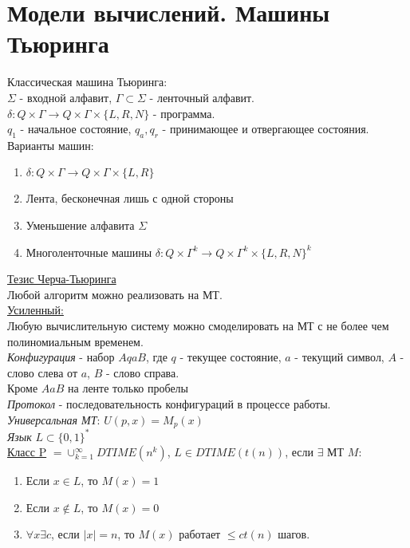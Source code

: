 	\section{Модели вычислений. Машины Тьюринга}
	Классическая машина Тьюринга:\\
	$\Sigma$ - входной алфавит, $\Gamma \subset \Sigma$ - ленточный алфавит.\\
	$\delta: Q\times\Gamma \to Q\times\Gamma\times\{L,R,N\}$ - программа.\\
	$q_1$ - начальное состояние,  $q_a, q_r$ - принимающее и отвергающее состояния.\\
	
	Варианты машин:
	\begin{enumerate}
		\item $\delta: Q\times\Gamma \to Q\times\Gamma\times\{L,R\}$
		\item Лента, бесконечная лишь с одной стороны
		\item Уменьшение алфавита $\Sigma$
		\item  Многоленточные машины $\delta:Q\times\Gamma^k \to Q\times\Gamma^k\times \{L,R,N\}^k$
	\end{enumerate} 
	\underline{Тезис Черча-Тьюринга}\\Любой алгоритм можно реализовать на МТ.\\
	\underline{Усиленный:}\\Любую вычислительную систему можно смоделировать на МТ с не более чем полиномиальным временем.\\
	\emph{Конфигурация} - набор $AqaB$, 
	где $q$ - текущее состояние, $a$ - текущий символ, $A$ - слово слева от $a$, $B$ - слово справа.\\ Кроме $AaB$ на ленте только пробелы \\
	\emph{Протокол} - последовательность конфигураций в процессе работы.\\
	\emph{Универсальная МТ}: $U(p,x) = M_p(x)$\\
	\emph{Язык} $L \subset \{0,1\}^*$\\
	
	
	\underline{Класс P} $ = \cup_{k=1}^{\infty}DTIME(n^k)$,	$L \in DTIME(t(n))$, если $\exists$ МТ $M$:
	\begin{enumerate}
		\item Если $x\in L$, то  $M(x)=1$
		\item Если $x \not\in L$, то $M(x)=0$
		\item $\forall x \exists c$, если $|x|=n$, то  $M(x)$ работает $\le ct(n)$ шагов.\\
	\end{enumerate}
	
